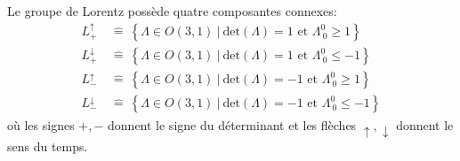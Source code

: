 \documentclass[a4paper,11pt]{report}
\begin{document}
            \begin{prop}\begin{leftbar}
                Le groupe de Lorentz possède quatre composantes connexes:
                \begin{align}
                    L^\uparrow_+ &~\hat{=}~ \left\{\Lambda\in O(3,1)~\big|~\text{det}(\Lambda) = 1\text{ et }\Lambda^0_{~0}\geq1\right\} \\
                    L^\downarrow_+ &~\hat{=}~ \left\{\Lambda\in O(3,1)~\big|~\text{det}(\Lambda) = 1\text{ et }\Lambda^0_{~0}\leq -1\right\} \\
                    L^\uparrow_- &~\hat{=}~ \left\{\Lambda\in O(3,1)~\big|~\text{det}(\Lambda) = -1\text{ et }\Lambda^0_{~0}\geq1\right\} \\
                    L^\downarrow_- &~\hat{=}~ \left\{\Lambda\in O(3,1)~\big|~\text{det}(\Lambda) = -1\text{ et }\Lambda^0_{~0}\leq-1\right\}
                \end{align}
                où les signes $+,-$ donnent le signe du déterminant et les flèches $\uparrow,\downarrow$ donnent le sens du temps.
            \end{leftbar}\end{prop}
            
\end{document}
